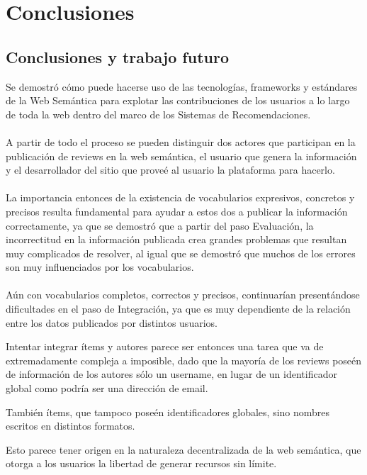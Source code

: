 \part{Conclusiones}

\chapter{Conclusiones y trabajo futuro}
\label{chapter:conclusiones}

Se demostró cómo puede hacerse uso de las tecnologías, frameworks y estándares de la Web 
Semántica para explotar las contribuciones de los usuarios a lo largo de toda la web dentro 
del marco de los Sistemas de Recomendaciones.
\\\\
A partir de todo el proceso se pueden distinguir dos actores que participan en la publicación 
de reviews en la web semántica, el usuario que genera la información y el desarrollador
del sitio que proveé al usuario la plataforma para hacerlo.
\\\\
La importancia entonces de la existencia de vocabularios expresivos, concretos y precisos 
resulta fundamental para ayudar a estos dos a publicar la información correctamente, ya que 
se demostró que a partir del paso Evaluación, la incorrectitud en la información publicada 
crea grandes problemas que resultan muy complicados de resolver, al igual que se demostró 
que muchos de los errores son muy influenciados por los vocabularios.
\\\\
Aún con vocabularios completos, correctos y precisos, continuarían presentándose dificultades en 
el paso de Integración, ya que es muy dependiente de la relación entre los datos publicados 
por distintos usuarios.

Intentar integrar ítems y autores parece ser entonces una tarea que va de extremadamente compleja 
a imposible, dado que la mayoría de los reviews poseén de información de los autores sólo un username, 
en lugar de un identificador global como podría ser una dirección de email.

También ítems, que tampoco poseén identificadores globales, sino nombres escritos en 
distintos formatos.

Esto parece tener origen en la naturaleza decentralizada de la web semántica, que otorga 
a los usuarios la libertad de generar recursos sin límite.

